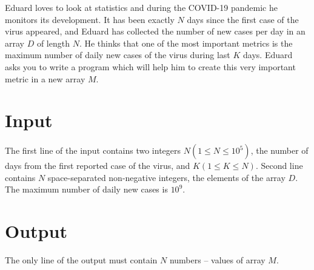 Eduard loves to look at statistics and during the COVID-19 pandemic he monitors its development.
It has been exactly $N$ days since the first case of the virus appeared,
and Eduard has collected the number of new cases per day in an array $D$ of length $N$.
He thinks that one of the most important metrics is the maximum number of daily new cases of the virus during last $K$ days.
Eduard asks you to write a program which will help him to create this very important metric in a new array $M$.


\section*{Input}
The first line of the input contains two integers
$N (1 \leq N \leq 10^5)$, the number of days from the first reported case of the virus, and $K (1 \leq K \leq N)$.
Second line contains $N$ space-separated non-negative integers, the elements of the array  $D$.
The maximum number of daily new cases is $10^9$.

\section*{Output}
The only line of the output must contain $N$ numbers -- values of array $M$.
